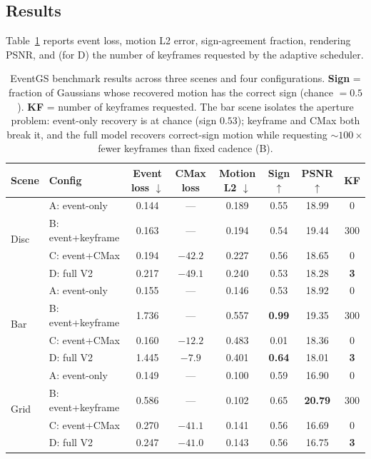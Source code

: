\subsection{Results}
Table~\ref{tab:results} reports event loss, motion L2 error, sign-agreement fraction, rendering PSNR, and (for D) the number of keyframes requested by the adaptive scheduler.

\begin{table}[t]
\centering
\small
\caption{EventGS benchmark results across three scenes and four configurations. \textbf{Sign} = fraction of Gaussians whose recovered motion has the correct sign (chance $=0.5$). \textbf{KF} = number of keyframes requested. The bar scene isolates the aperture problem: event-only recovery is at chance (sign $0.53$); keyframe and CMax both break it, and the full model recovers correct-sign motion while requesting $\sim$$100\times$ fewer keyframes than fixed cadence (B).}
\label{tab:results}
\begin{tabular}{llcccccc}
\toprule
Scene & Config & Event loss $\downarrow$ & CMax loss & Motion L2 $\downarrow$ & Sign $\uparrow$ & PSNR $\uparrow$ & KF \\
\midrule
\multirow{4}{*}{Disc} & A: event-only & 0.144 & --- & 0.189 & 0.55 & 18.99 & 0 \\
 & B: event+keyframe & 0.163 & --- & 0.194 & 0.54 & 19.44 & 300 \\
 & C: event+CMax & 0.194 & $-42.2$ & 0.227 & 0.56 & 18.65 & 0 \\
 & D: full V2 & 0.217 & $-49.1$ & 0.240 & 0.53 & 18.28 & \textbf{3} \\
\midrule
\multirow{4}{*}{Bar} & A: event-only & 0.155 & --- & 0.146 & 0.53 & 18.92 & 0 \\
 & B: event+keyframe & 1.736 & --- & 0.557 & \textbf{0.99} & 19.35 & 300 \\
 & C: event+CMax & 0.160 & $-12.2$ & 0.483 & 0.01 & 18.36 & 0 \\
 & D: full V2 & 1.445 & $-7.9$ & 0.401 & \textbf{0.64} & 18.01 & \textbf{3} \\
\midrule
\multirow{4}{*}{Grid} & A: event-only & 0.149 & --- & 0.100 & 0.59 & 16.90 & 0 \\
 & B: event+keyframe & 0.586 & --- & 0.102 & 0.65 & \textbf{20.79} & 300 \\
 & C: event+CMax & 0.270 & $-41.1$ & 0.141 & 0.56 & 16.69 & 0 \\
 & D: full V2 & 0.247 & $-41.0$ & 0.143 & 0.56 & 16.75 & \textbf{3} \\
\bottomrule
\end{tabular}
\end{table}

